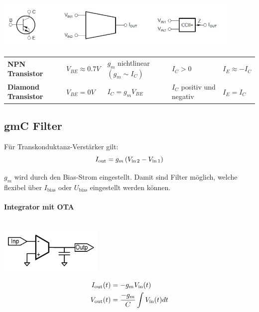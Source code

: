 \begin{center}
	\includegraphics[width=12cm]{images/op_diamond}
\end{center}

\begin{tabular}{lllll}
	\textbf{NPN Transistor} & $V_{BE} \approx 0.7V$ & 
		$g_m$ nichtlinear $(g_m \sim I_C)$ & $I_C > 0$ & $I_E \approx-I_C$ \\
	\textbf{Diamond Transistor} & $V_{BE} = 0V$ & $I_C = g_m V_{BE}$ &
		$I_C$ positiv und negativ & $I_E = I_C$ \\
\end{tabular}

\subsection{gmC Filter}
\begin{multicols}{2}
	Für Transkonduktanz-Verstärker gilt:
	\begin{equation*}
		I_{\operatorname{\text{out}}} = g_m \left( V_{\operatorname{\text{in}} 2} - V_{\operatorname{\text{in}} 1} \right)
	\end{equation*}
	
	$g_m$ wird durch den Bias-Strom eingestellt. 
	Damit sind Filter möglich, welche flexibel über $I_{\text{bias}}$ oder $U_{\text{bias}}$ eingestellt werden können. \\
	
	\paragraph{Integrator mit OTA}~\\
	\includegraphics[width=5cm]{images/gmC_filter.jpg}

	\begin{align*}
		I_{\operatorname{\text{out}}}(t) &= -g_m V_{\operatorname{\text{in}}} (t) \\
		V_{\operatorname{\text{out}}}(t) &= \frac{-g_m}{C} \int V_{\operatorname{\text{in}}}(t) dt
	\end{align*}
\end{multicols}